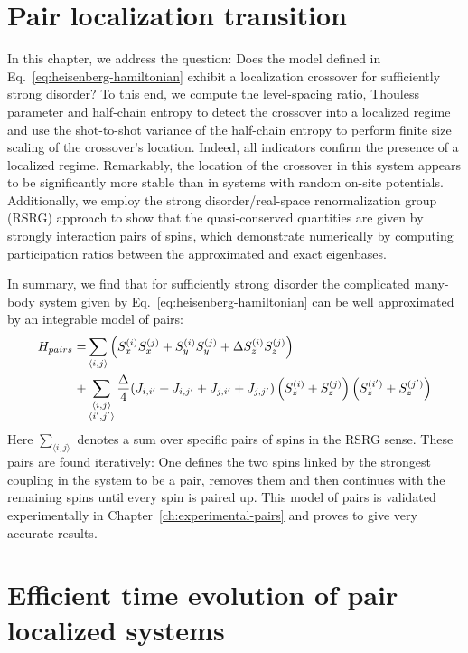 \chapter{Pair localization transition}\label{ch:pair-localization-transition}

In this chapter, we address the question: Does the model defined in Eq.~\ref{eq:heisenberg-hamiltonian} exhibit a localization crossover for sufficiently strong disorder? To this end, we compute the level-spacing ratio, Thouless parameter and half-chain entropy to detect the crossover into a localized regime and use the shot-to-shot variance of the half-chain entropy to perform finite size scaling of the crossover's location. Indeed, all indicators confirm the presence of a localized regime. Remarkably, the location of the crossover in this system appears to be significantly more stable than in systems with random on-site potentials. Additionally, we employ the strong disorder/real-space renormalization group (RSRG) approach to show that the quasi-conserved quantities are given by strongly interaction pairs of spins, which demonstrate numerically by computing participation ratios between the approximated and exact eigenbases.

In summary, we find that for sufficiently strong disorder the complicated many-body system given by Eq.~\ref{eq:heisenberg-hamiltonian} can be well approximated by an integrable model of pairs:
\begin{align}\label{eq:pair-model}
	H_{pairs} =& \sum_{\langle i,j\rangle} \left(S_x^{(i)}S_x^{(j)} + S_y^{(i)}S_y^{(j)} + \Delta S_z^{(i)}S_z^{(j)}\right) \notag\\
	+ &\sum_{\substack{\langle i,j\rangle\\\langle i',j'\rangle}} \frac{\Delta}{4}(J_{i,i'}+J_{i,j'}+J_{j,i'}+J_{j,j'})\left(S_z^{(i)}+S_z^{(j)}\right)\left(S_z^{(i')}+S_z^{(j')}\right)
\end{align}
Here $\sum_{\langle i,j\rangle}$ denotes a sum over specific pairs of spins in the RSRG sense. These pairs are found iteratively: One defines the two spins linked by the strongest coupling in the system to be a pair, removes them and then continues with the remaining spins until every spin is paired up. This model of pairs is validated experimentally in Chapter~\ref{ch:experimental-pairs} and proves to give very accurate results.



\chapter{Efficient time evolution of pair localized systems}\label{ch:cTWA-paper}

